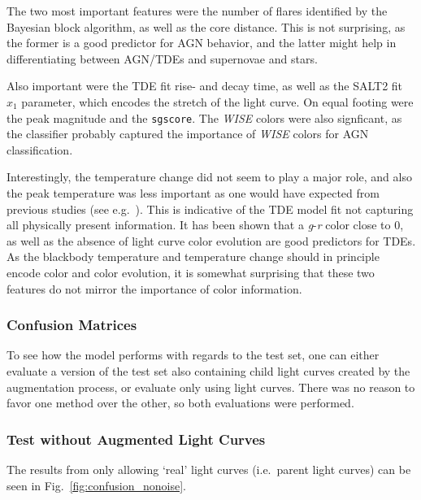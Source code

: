 The two most important features were the number of flares identified by the Bayesian block algorithm, as well as the core distance. This is not surprising, as the former is a good predictor for AGN behavior, and the latter might help in differentiating between AGN/TDEs and supernovae and stars.

Also important were the TDE fit rise- and decay time, as well as the SALT2 fit $x_1$ parameter, which encodes the stretch of the light curve. On equal footing were the peak magnitude and the \texttt{sgscore}. The \textit{WISE} colors were also signficant, as the classifier probably captured the importance of \textit{WISE} colors for AGN classification.

Interestingly, the temperature change did not seem to play a major role, and also the peak temperature was less important as one would have expected from previous studies (see e.g.~\cite{Velzen2021a}). This is indicative of the TDE model fit not capturing all physically present information. It has been shown that a \textit{g}-\textit{r} color close to 0, as well as the absence of light curve color evolution are good predictors for TDEs. As the blackbody temperature and temperature change should in principle encode color and color evolution, it is somewhat surprising that these two features do not mirror the importance of color information.

\subsubsection{Confusion Matrices}\label{confusion_matrices}
To see how the model performs with regards to the test set, one can either evaluate a version of the test set also containing child light curves created by the augmentation process, or evaluate only using light curves. There was no reason to favor one method over the other, so both evaluations were performed.

\subsubsection{Test without Augmented Light Curves}
The results from only allowing `real' light curves (i.e.~parent light curves) can be seen in Fig.~\ref{fig:confusion_nonoise}.

